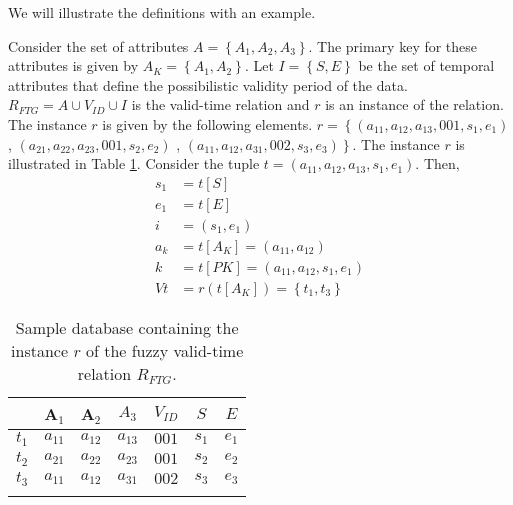 \begin{definition}
We will illustrate the definitions with an example.

\begin{example}
Consider the set of attributes $A = \left \lbrace A_1, A_2, A_3 \right \rbrace$. The primary key for these attributes is given by $A_K = \left \lbrace A_1, A_2 \right \rbrace$. Let $I = \left \lbrace S, E \right \rbrace$ be the set of temporal attributes that define the possibilistic validity period of the data. $R_{FTG} = A \cup V_{ID} \cup I$ is the valid-time relation and $r$ is an instance of the relation. The instance $r$ is given by the following elements. $r = \left \lbrace \left(a_{11}, a_{12}, a_{13}, 001, s_1 ,e_1 \right) \right.$,  $\left(a_{21}, a_{22}, a_{23}, 001, s_2, e_2 \right)$ , $\left. \left(a_{11}, a_{12}, a_{31}, 002, s_3, e_3 \right) \right \rbrace$. The instance $r$ is illustrated in Table \ref{tbl:fuzzy-sample-definitions}. 
Consider the tuple $t = \left(a_{11}, a_{12}, a_{13}, s_1 ,e_1 \right)$. Then,
\begin{align}
 \nonumber
s_1 &= t\left[S \right]\\
 \nonumber
e_1 &= t[E]\\
 \nonumber
i\ \ &= \left(s_1, e_1\right)\\
 \nonumber
a_k &= t\left[A_K\right] = \left(a_{11}, a_{12} \right) \\
 \nonumber
k &= t\left[PK\right] =\left(a_{11}, a_{12}, s_1, e_1\right)\\
 \nonumber
Vt &= r\left(t\left[A_K\right] \right) = \left \lbrace t_1, t_3 \right \rbrace
\end{align}



\end{example}

\begin{table}[h]
\caption[Example of fuzzy valid-time relation.]{\label{tbl:fuzzy-sample-definitions}Sample database containing the instance $r$ of the fuzzy valid-time relation $R_{FTG}$.}
\centering
\begin{tabular}{c c c c c c c}\\ \hline
& \textbf{A$_1$}  & \textbf{A$_2$}  & $A_3$ & $V_{ID}$ & $S$ & $E$ \\
\hline
$t_1$&$a_{11}$ & $a_{12}$ & $a_{13}$ & $001$ & $s_1$ & $e_1$ \\
$t_2$ & $a_{21}$ & $a_{22}$ & $a_{23}$& $001$ &  $s_2$ & $e_2$ \\
$t_3$ & $a_{11}$ & $a_{12}$ & $a_{31}$& $002$ & $s_3$ & $e_3$\\
\hline\\
\end{tabular}
\end{table}




\end{definition}
